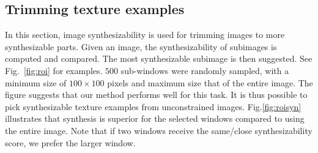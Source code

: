 



\subsection{Trimming texture examples}
In this section, image synthesizability is used for trimming images to
more synthesizable parts. Given an image, the synthesizability of
subimages is computed and compared. The most synthesizable subimage is
then suggested. See Fig.~\ref{fig:roi} for examples. $500$ sub-windows
were randomly sampled, with a minimum size of $100 \times 100$ pixels
and maximum size that of the entire image.  The figure suggests that
our method performs well for this task. It is thus possible to pick
synthesizable texture examples from unconstrained images.
Fig.\ref{fig:roisyn} illustrates that synthesis is superior for the
selected windows compared to using the entire image.  Note that if two
windows receive the same/close synthesizability score, we prefer the
larger window.




